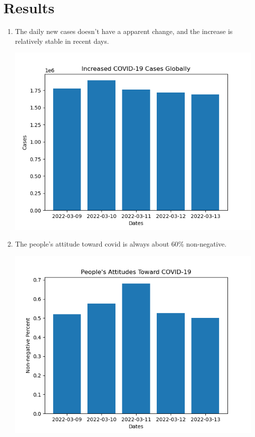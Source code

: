 \documentclass[a4paper, 12pt]{article}
\begin{document}
\section*{Results}
\begin{enumerate}
    \item The daily new cases doesn't have a apparent change, and the increase is relatively stable in recent days.
    \begin{center}
        \includegraphics[scale=0.7]{cases.png}
    \end{center}
    \item The people's attitude toward covid is always about 60\% non-negative.
    \begin{center}
        \includegraphics[scale=0.7]{attitudes.png}

\end{center}
\end{enumerate}
\end{document}
